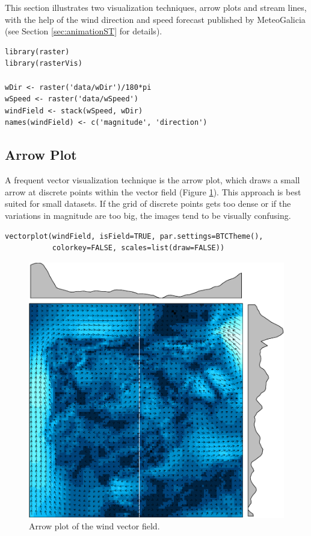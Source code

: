 \documentclass[smallroyalvopaper]{memoir}
\begin{document}
This section illustrates two visualization techniques, arrow plots and
stream lines, with the help of the wind direction and speed forecast
published by MeteoGalicia (see Section \ref{sec:animationST} for
details).


\lstset{language=R,numbers=none}
\begin{lstlisting}
library(raster)
library(rasterVis)

wDir <- raster('data/wDir')/180*pi
wSpeed <- raster('data/wSpeed')
windField <- stack(wSpeed, wDir)
names(windField) <- c('magnitude', 'direction')
\end{lstlisting}

\subsection{Arrow Plot}
\label{sec-1-1}
A frequent vector visualization technique is the arrow plot, which
draws a small arrow at discrete points within the vector field
(Figure \ref{fig:vectorplot}). This approach is best suited for
small datasets. If the grid of discrete points gets too dense or
if the variations in magnitude are too big, the images tend to be
visually confusing.

\lstset{language=R,numbers=none}
\begin{lstlisting}
vectorplot(windField, isField=TRUE, par.settings=BTCTheme(),
           colorkey=FALSE, scales=list(draw=FALSE))
\end{lstlisting}

\begin{figure}[htb]
\centering
\includegraphics[width=.9\linewidth]{figs/vectorplot.pdf}
\caption{\label{fig:vectorplot}Arrow plot of the wind vector field.}
\end{figure}
\end{document}
